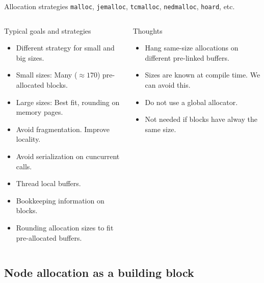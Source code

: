 \documentclass[10pt,aspectratio=169]{beamer}
\begin{document}
\begin{frame}{Allocation strategies}
{\texttt{malloc}, \texttt{jemalloc}, \texttt{tcmalloc},
\texttt{nedmalloc}, \texttt{hoard}, etc.}
\begin{columns}
\begin{column}{0.47\textwidth}
\begin{block} {Typical goals and strategies}
\begin{itemize}
\item<alert@1> Different strategy for small and big sizes.
\item<alert@2> Small sizes: Many ($\approx 170$) pre-allocated blocks.
\item<alert@3> Large sizes: Best fit, rounding on memory pages.
\item<alert@1> Avoid fragmentation. Improve locality.
\item<alert@4> Avoid serialization on cuncurrent calls.
\item<alert@4> Thread local buffers.
\item<alert@5> Bookkeeping information on blocks.
\item<alert@2> Rounding allocation sizes to fit pre-allocated buffers.
\end{itemize}
\end{block}
\end{column}

\begin{column}{0.47\textwidth}
\begin{block} {Thoughts}
\begin{itemize}
\item<alert@1> Hang same-size allocations on different pre-linked buffers.
\item<alert@2> Sizes are known at compile time. We can avoid this.
\item<alert@3> Do not use a global allocator.
\item<alert@4> Not needed if blocks have alway the same size.
\end{itemize}
\end{block}

\end{column}
\end{columns}
\end{frame}

\subsection{Node allocation as a building block}
\end{document}
